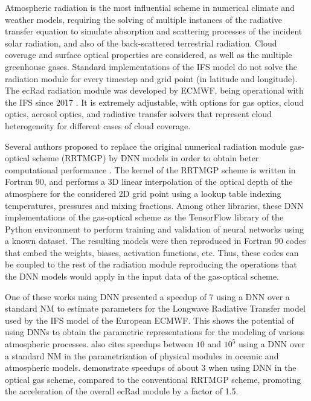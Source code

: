 Atmospheric radiation is the most influential scheme in numerical climate and weather models, requiring the solving of multiple instances of the radiative transfer equation to simulate absorption and scattering processes of the incident solar radiation, and also of the back-scattered terrestrial radiation. Cloud coverage and surface optical properties are considered, as well as the multiple greenhouse gases. Standard implementations of the IFS model do not solve the radiation module for every timestep and grid point (in latitude and longitude). The ecRad radiation module was developed by ECMWF, being operational with the IFS since 2017 \cite{Hogan2018}. It is extremely adjustable, with options for gas optics, cloud optics, aerosol optics, and radiative transfer solvers that represent cloud heterogeneity for different cases of cloud coverage.


Several authors proposed to replace the original numerical radiation module gas-optical scheme (RRTMGP) by DNN models in order to obtain beter computational performance \cite{Ukkonen2023,Veerman2021,Meyer2022a}. The kernel of the RRTMGP scheme is written in Fortran 90, and performs a 3D linear interpolation of the optical depth of the atmosphere for the considered 2D grid point using a lookup table indexing temperatures, pressures and mixing fractions. Among other libraries, these DNN implementations of the gas-optical scheme as  the TensorFlow library of the Python environment to perform training and validation of neural networks using a known dataset. The resulting models were then reproduced in Fortran 90 codes that embed the weights, biases, activation functions, etc. Thus, these codes can be coupled to the rest of the radiation module reproducing the operations that the DNN models would apply in the input data of the gas-optical scheme.

One of these works using DNN \cite{Chevallier2000} presented a speedup of $7$ using a DNN over a standard NM to estimate parameters for the Longwave Radiative Transfer model used by the IFS model of the European ECMWF. This shows the potential of using DNNs to obtain the parametric representations for the modeling of various atmospheric processes.  also cites speedups between $10$ and $10^5$ using a DNN over a standard NM in the parametrization of physical modules in oceanic and atmospheric models.  demonstrate speedups of about 3 when using DNN in the optical gas scheme, compared to the conventional RRTMGP scheme, promoting the acceleration of the overall ecRad module by a factor of 1.5. 

